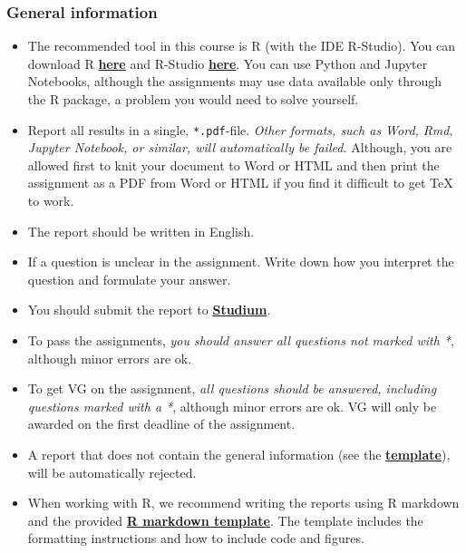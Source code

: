 
\subsubsection*{General information}

\begin{itemize}
\itemsep0em
\item The recommended tool in this course is R (with the IDE R-Studio). You can download R \href{https://cran.r-project.org/}{\textbf{here}} and R-Studio \href{https://www.rstudio.com/products/rstudio/download/}{\textbf{here}}. You can use Python and Jupyter Notebooks, although the assignments may use data available only through the R package, a problem you would need to solve yourself.

\item  Report all results in a single, \texttt{*.pdf}-file. \emph{Other formats, such as Word, Rmd, Jupyter Notebook, or similar, will automatically be failed.} Although, you are allowed first to knit your document to Word or HTML and then print the assignment as a PDF from Word or HTML if you find it difficult to get TeX to work.

\item The report should be written in English.

\item If a question is unclear in the assignment. Write down how you interpret the question and formulate your answer.

\item You should submit the report to \href{https://studium.uu.se/}{\textbf{Studium}}.

\item To pass the assignments, \emph{you should answer all questions not marked with *}, although minor errors are ok.

\item To get VG on the assignment, \emph{all questions should be answered, including questions marked with a *}, although minor errors are ok. VG will only be awarded on the first deadline of the assignment.

\item A report that does not contain the general information (see the \href{https://raw.githubusercontent.com/MansMeg/IntroML/master/templates/assignment_template.pdf}{\textbf{template}}), will be automatically rejected.

\item When working with R, we recommend writing the reports using R markdown and the provided \href{https://raw.githubusercontent.com/MansMeg/IntroML/master/templates/assignment_template.rmd}{\textbf{R markdown template}}. The template includes the formatting instructions and how to include code and figures.


\end{itemize}
